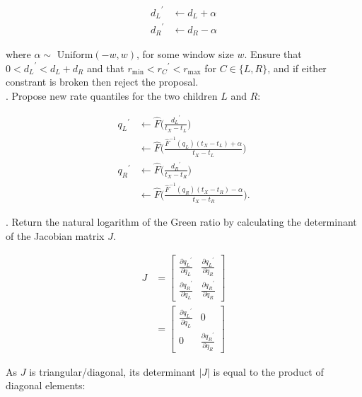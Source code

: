 \documentclass[12pt]{article}
\begin{document}
\begin{align}
	{d_L}^\prime & \leftarrow d_L + \alpha \\
	{d_R}^\prime & \leftarrow d_R - \alpha
\end{align}

where $\alpha \sim \text{ Uniform}(-w, w)$, for some window size $w$. Ensure that $0 < {d_L}^\prime < d_L + d_R$ and that $r_\text{min} < {r_C}^\prime < r_\text{max}$ for $C \in \{ L, R \}$, and if either constrant is broken then reject the proposal.  \\




. Propose new rate quantiles for the two children $L$ and $R$:


\begin{align}
	{q_L}^\prime &\leftarrow \hat{F}\big( \frac{{d_L}^\prime}{t_X - t_L} \big) \nonumber\\
				 &\leftarrow \hat{F}\big( \frac{\hat{F}^{-1} (q_L) (t_X - t_L) + \alpha}{t_X - t_L} \big) \\
	{q_R}^\prime &\leftarrow \hat{F}\big( \frac{{d_R}^\prime}{t_X - t_R} \big) \nonumber \\
				 &\leftarrow \hat{F}\big( \frac{\hat{F}^{-1} (q_R) (t_X - t_R) - \alpha}{t_X - t_R} \big).
\end{align}



. Return the natural logarithm of the Green ratio by calculating the determinant of the Jacobian matrix $J$.


\begin{align}
	J &= \begin{bmatrix} \frac{\partial {q_L}^\prime}{\partial q_L} & \frac{\partial {q_L}^\prime}{\partial q_R} \\
						 \frac{\partial {q_R}^\prime}{\partial q_L} & \frac{\partial {q_R}^\prime}{\partial q_R} \end{bmatrix} \nonumber \\
	 &= \begin{bmatrix} \frac{\partial {q_L}^\prime}{\partial q_L} & 0 \\
						 0 & \frac{\partial {q_R}^\prime}{\partial q_R} \end{bmatrix}
\end{align}


As $J$ is triangular/diagonal, its determinant $|J|$ is equal to the product of diagonal elements:
\end{document}
